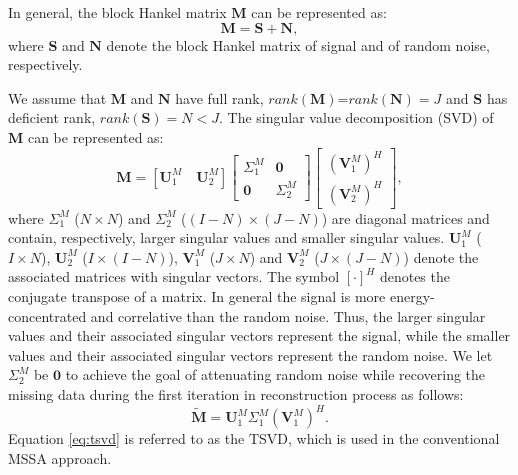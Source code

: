 In general, the block Hankel matrix $\mathbf{M}$ can be represented as:
\begin{equation}
\label{eq:M}
\mathbf{M}=\mathbf{S}+\mathbf{N},
\end{equation}
where $\mathbf{S}$ and $\mathbf{N}$ denote the block Hankel matrix of signal and of random noise, respectively.

We assume that $\mathbf{M}$ and $\mathbf{N}$ have full rank, $rank(\mathbf{M})$=$rank(\mathbf{N})=J$ and $\mathbf{S}$ has deficient rank, $rank(\mathbf{S})=N<J$. The singular value decomposition (SVD) of $\mathbf{M}$ can be represented as:
\begin{equation}
\label{eq:svdm}
\mathbf{M} = [\mathbf{U}_1^M\quad \mathbf{U}_2^M]\left[\begin{array}{cc} 
\Sigma_1^M & \mathbf{0}\\
\mathbf{0} & \Sigma_2^M
\end{array}
\right]\left[\begin{array}{c} 
(\mathbf{V}_1^M)^H\\
(\mathbf{V}_2^M)^H
\end{array}
\right],
\end{equation}
where $\Sigma_1^M$ ($N\times N$) and $\Sigma_2^M$ ($(I-N)\times(J-N)$) are diagonal matrices and contain, respectively, larger singular values and smaller singular values. $\mathbf{U}_1^M$ ($I\times N$), $\mathbf{U}_2^M$ ($I\times (I-N)$), $\mathbf{V}_1^M$ ($J\times N$) and $\mathbf{V}_2^M$ ($J\times (J-N)$) denote the associated matrices with singular vectors. The symbol $[\cdot]^H$ denotes the conjugate transpose of a matrix. In general the signal is more energy-concentrated and correlative than the random noise.  Thus, the larger singular values and their associated singular vectors represent the signal, while the smaller values and their associated singular vectors represent the random noise. We let $\Sigma_2^M$ be $\mathbf{0}$ to achieve the goal of attenuating random noise while recovering the missing data during the first iteration in reconstruction process as follows:
\begin{equation}
\label{eq:tsvd}
\tilde{\mathbf{M}} = \mathbf{U}_1^M\Sigma_1^M(\mathbf{V}_1^M)^H.
\end{equation}
Equation \ref{eq:tsvd} is referred to as the TSVD, which is used in the conventional MSSA approach.



